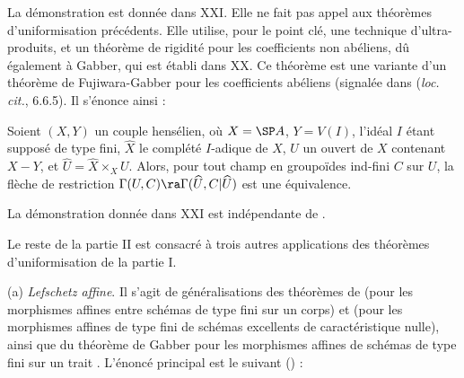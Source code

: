 \documentclass[10pt]{../fichiers-configuration-latex/smfart}
\begin{document}
La démonstration est donnée dans XXI. Elle ne fait pas appel aux
théorèmes d'uniformisation précédents. Elle utilise, pour le point clé, une technique
d'ultra-produits, et un théorème de rigidité pour les coefficients non abéliens, dû également à
Gabber, qui est établi dans XX. Ce théorème est une variante d'un théorème de Fujiwara-Gabber pour
les coefficients abéliens \cite[6.6.4, 7.1.1]{TUBULAR@Fujiwara} (signalée dans (\textit{loc. cit.},
6.6.5). Il s'énonce ainsi :

\begin{theoreme}\label{0-rigidité}
Soient $(X,Y)$ un couple hensélien,
où $X = \SP A$, $Y = V(I)$, l'idéal $I$ étant supposé de type fini, $\widehat X$ le complété
$I$-adique de $X$, $U$ un ouvert de $X$ contenant $X-Y$, et $\widehat U = \widehat X \times_X U$.
Alors, pour tout champ en groupoïdes ind-fini $C$ sur $U$, la flèche de restriction $\Gamma(U,C) \ra
\Gamma(\widehat U, C \vert \widehat U)$ est une équivalence.
\end{theoreme}
La démonstration donnée dans XXI est indépendante de \cite{TUBULAR@Fujiwara}.

\medskip Le reste de la partie II est consacré à trois autres applications des théorèmes
d'uniformisation de la partie I.

(a) \textit{Lefschetz affine}. Il s'agit de généralisations des théorèmes de  (pour
les morphismes affines entre schémas de type fini sur un corps) et  (pour les
morphismes affines de type fini de schémas excellents de caractéristique nulle), ainsi que du
théorème de Gabber pour les morphismes affines de schémas de type fini sur un trait
\cite{PV@Illusie}. L'énoncé principal est le suivant () :
\end{document}
